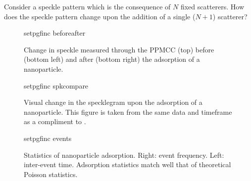 
Consider a speckle pattern which is the consequence of $N$ fixed
scatterers.  How does the speckle pattern change upon the addition of a
single ($N+1$) scatterer?  

\begin{figure}
\centering
{setpgfinc}
{beforeafter}
\caption{Change in speckle measured through the PPMCC (top) before (bottom
left) and after (bottom right) the adsorption of a nanoparticle.  }
\label{fig:scattbeforeafter}
\end{figure}

\begin{figure}
\centering
{setpgfinc}
{spkcompare}
\caption{Visual change in the specklegram upon the adsorption of a
				nanoparticle.  This figure is taken from the same data and timeframe
				as a compliment to .}
\label{fig:scattspkcompare}
\end{figure}

\begin{figure}
\centering
{setpgfinc}
{events}
\caption{Statistics of nanoparticle adsorption.  Right: event frequency.
Left: inter-event time.  Adsorption statistics match well that of theoretical
Poisson statistics.}
\label{fig:scattbeforeafter}
\end{figure}

